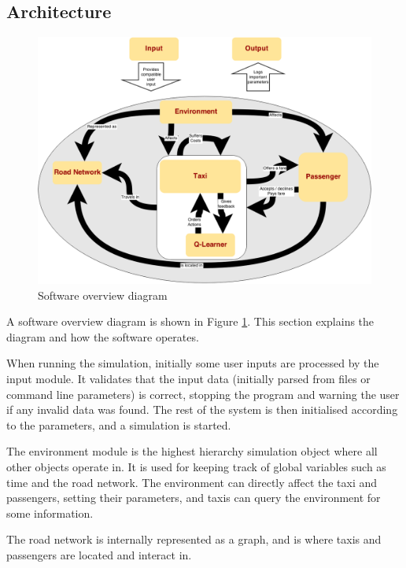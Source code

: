 \subsection{Architecture} 
\label{sec:design:architecture}

\begin{figure}
  \begin{center}
    \includegraphics[width=\textwidth]{../figures/software_overview}
    \caption{
      Software overview diagram
      \label{figure:design:software}
    }
  \end{center}
\end{figure}

A software overview diagram is shown in Figure \ref{figure:design:software}.
This section explains the diagram and how the software operates.

When running the simulation, initially some user inputs are processed by the
input module. It validates that the input data (initially parsed from files or
command line parameters) is correct, stopping the program and warning the user
if any invalid data was found. The rest of the system is then initialised
according to the parameters, and a simulation is started.

The environment module is the highest hierarchy simulation object where all
other objects operate in. It is used for keeping track of global variables such
as time and the road network. The environment can directly affect the taxi and
passengers, setting their parameters, and taxis can query the environment for
some information.

The road network is internally represented as a graph, and is where taxis and
passengers are located and interact in.

